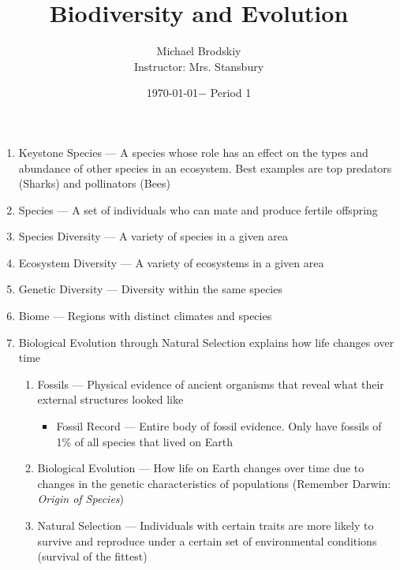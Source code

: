 \documentclass[12pt]{article}
\title{Biodiversity and Evolution}
\date{\today $-$ Period 1}
\author{Michael Brodskiy\\ \small Instructor: Mrs. Stansbury}
\begin{document}
\maketitle

\begin{enumerate}

  \item Keystone Species — A species whose role has an effect on the types and abundance of other species in an ecosystem. Best examples are top predators (Sharks) and pollinators (Bees)

  \item Species — A set of individuals who can mate and produce fertile offspring

  \item Species Diversity — A variety of species in a given area

  \item Ecosystem Diversity — A variety of ecosystems in a given area

  \item Genetic Diversity — Diversity within the same species

  \item Biome — Regions with distinct climates and species

  \item Biological Evolution through Natural Selection explains how life changes over time

    \begin{enumerate}

      \item Fossils — Physical evidence of ancient organisms that reveal what their external structures looked like

        \begin{itemize}

          \item Fossil Record — Entire body of fossil evidence. Only have fossils of 1\% of all species that lived on Earth

        \end{itemize}

      \item Biological Evolution — How life on Earth changes over time due to changes in the genetic characteristics of populations (Remember Darwin: \textit{Origin of Species})

      \item Natural Selection — Individuals with certain traits are more likely to survive and reproduce under a certain set of environmental conditions (survival of the fittest)
        

\end{enumerate}
\end{enumerate}
\end{document}
